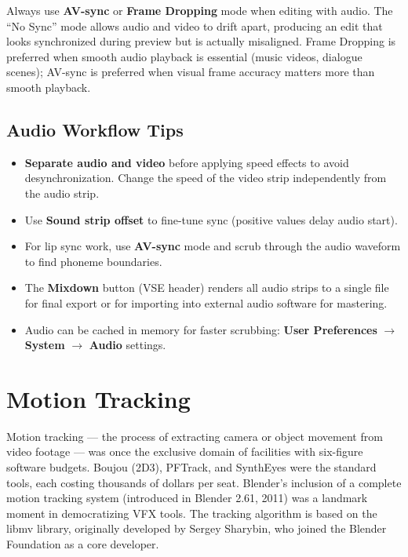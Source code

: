 \begin{warningbox}
Always use \textbf{AV-sync} or \textbf{Frame Dropping} mode when editing with audio. The ``No Sync'' mode allows audio and video to drift apart, producing an edit that looks synchronized during preview but is actually misaligned. Frame Dropping is preferred when smooth audio playback is essential (music videos, dialogue scenes); AV-sync is preferred when visual frame accuracy matters more than smooth playback.
\end{warningbox}

\subsection{Audio Workflow Tips}

\begin{itemize}[leftmargin=2em]
  \item \textbf{Separate audio and video} before applying speed effects to avoid desynchronization. Change the speed of the video strip independently from the audio strip.
  \item Use \textbf{Sound strip offset} to fine-tune sync (positive values delay audio start).
  \item For lip sync work, use \textbf{AV-sync} mode and scrub through the audio waveform to find phoneme boundaries.
  \item The \textbf{Mixdown} button (VSE header) renders all audio strips to a single file for final export or for importing into external audio software for mastering.
  \item Audio can be cached in memory for faster scrubbing: \textbf{User Preferences} $\rightarrow$ \textbf{System} $\rightarrow$ \textbf{Audio} settings.
\end{itemize}

\section{Motion Tracking}
\label{sec:motion-tracking}

\begin{historynote}
Motion tracking --- the process of extracting camera or object movement from video footage --- was once the exclusive domain of facilities with six-figure software budgets. Boujou (2D3), PFTrack, and SynthEyes were the standard tools, each costing thousands of dollars per seat. Blender's inclusion of a complete motion tracking system (introduced in Blender 2.61, 2011) was a landmark moment in democratizing VFX tools. The tracking algorithm is based on the libmv library, originally developed by Sergey Sharybin, who joined the Blender Foundation as a core developer.
\end{historynote}

